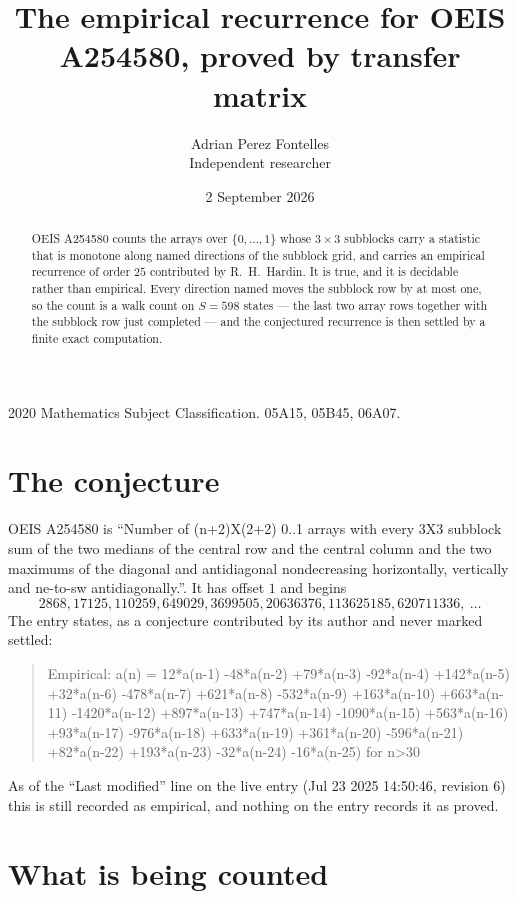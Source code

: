 \documentclass[11pt,a4paper]{article}
\title{The empirical recurrence for OEIS A254580, proved by transfer matrix}
\author{Adrian Perez Fontelles\\ \small Independent researcher}
\date{2 September 2026}
\theoremstyle{plain}
\theoremstyle{definition}
\begin{document}
\maketitle

\begin{abstract}
OEIS A254580 counts the arrays over $\{0,\dots,1\}$ whose $3\times3$ subblocks carry a
statistic that is monotone along named directions of the subblock grid, and carries an
empirical recurrence of order $25$ contributed by R.~H.~Hardin. It is true, and it is
decidable rather than empirical. Every direction named moves the subblock row by at most one,
so the count is a walk count on $S=598$ states --- the last two array rows together with the
subblock row just completed --- and the conjectured recurrence is then settled by a finite
exact computation.
\end{abstract}

\noindent\small 2020 Mathematics Subject Classification. 05A15, 05B45, 06A07.\normalsize

\section{The conjecture}

OEIS A254580 is ``Number of (n+2)X(2+2) 0..1 arrays with every 3X3 subblock sum of the two medians of the central row and the central column and the two maximums of the diagonal and antidiagonal nondecreasing horizontally, vertically and ne-to-sw antidiagonally.''. It has offset $1$ and begins
\[
2868, 17125, 110259, 649029, 3699505, 20636376, 113625185, 620711336,\ \dots
\]
The entry states, as a conjecture contributed by its author and never marked settled:
\begin{quote}
Empirical: a(n) = 12*a(n-1) -48*a(n-2) +79*a(n-3) -92*a(n-4) +142*a(n-5) +32*a(n-6) -478*a(n-7) +621*a(n-8) -532*a(n-9) +163*a(n-10) +663*a(n-11) -1420*a(n-12) +897*a(n-13) +747*a(n-14) -1090*a(n-15) +563*a(n-16) +93*a(n-17) -976*a(n-18) +633*a(n-19) +361*a(n-20) -596*a(n-21) +82*a(n-22) +193*a(n-23) -32*a(n-24) -16*a(n-25) for n>30
\end{quote}
As of the ``Last modified'' line on the live entry (Jul 23 2025 14:50:46, revision 6) this is still
recorded as empirical, and nothing on the entry records it as proved.

\section{What is being counted}
\end{document}
